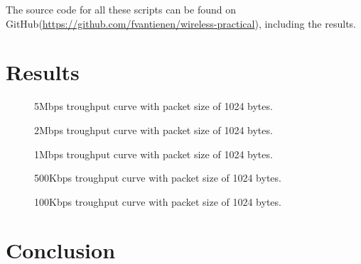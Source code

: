 \documentclass[]{article}
\begin{document}
The source code for all these scripts can be found on GitHub(\url{https://github.com/fvantienen/wireless-practical}), including the results.

\section{Results}

\begin{figure}[H]
    
   \caption{5Mbps troughput curve with packet size of 1024 bytes.\label{fig:tp_5}}
\end{figure}

\begin{figure}[H]
    
   \caption{2Mbps troughput curve  with packet size of 1024 bytes.\label{fig:tp_2}}
\end{figure}

\begin{figure}[H]
    
   \caption{1Mbps troughput curve  with packet size of 1024 bytes.\label{fig:tp_1}}
\end{figure}

\begin{figure}[H]
    
   \caption{500Kbps troughput curve  with packet size of 1024 bytes.\label{fig:tp_500}}
\end{figure}

\begin{figure}[H]
    
   \caption{100Kbps troughput curve  with packet size of 1024 bytes.\label{fig:tp_100}}
\end{figure}

\section{Conclusion}


\end{document}
